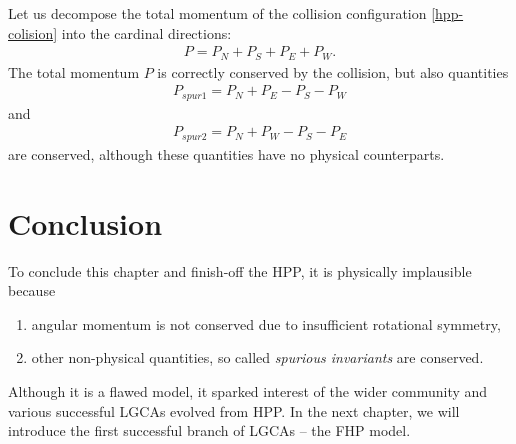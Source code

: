 Let us decompose the total momentum of the collision configuration \ref{hpp-colision} into the cardinal directions:
\begin{align} 
P = P_N + P_S + P_E + P_W.
\end{align}
The total momentum $P$ is correctly conserved by the collision, but also quantities
\begin{align} \label{zanet}
P_{spur1} = P_N + P_E - P_S - P_W
\end{align}
and
\begin{align}
P_{spur2} = P_N + P_W - P_S - P_E
\end{align}
are conserved, although these quantities have no physical counterparts.

\section{Conclusion}

To conclude this chapter and finish-off the HPP, it is physically implausible because
\begin{enumerate}
\item angular momentum is not conserved due to insufficient rotational symmetry,
\item other non-physical quantities, so called \textit{spurious invariants} are conserved.
\end{enumerate}

Although it is a flawed model, it sparked interest of the wider community and various successful LGCAs evolved from HPP. In the next chapter, we will introduce the first successful branch of LGCAs -- the FHP model.